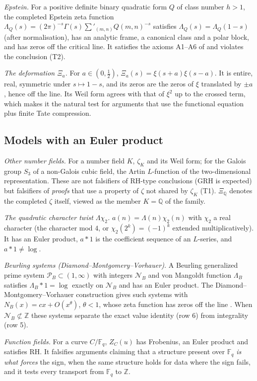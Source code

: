 \documentclass[11pt]{amsart}
\theoremstyle{definition}
\theoremstyle{remark}
\newcommand{\Z}{\mathbb Z}
\newcommand{\Q}{\mathbb Q}
\begin{document}
\emph{Epstein.} For a positive definite binary quadratic form $Q$ of class number $h>1$, the completed
Epstein zeta function $\Lambda_Q(s)=(2\pi)^{-s}\Gamma(s)\sum'_{(m,n)}Q(m,n)^{-s}$ satisfies
$\Lambda_Q(s)=\Lambda_Q(1-s)$ (after normalisation), has an analytic frame, a canonical class and a
polar block, and has zeros off the critical line. It satisfies the axioms A1--A6 of \cite[\S18]{Paper46}
and violates the conclusion (T2).

\emph{The deformation $\Xi_a$.} For $a\in(0,\frac12)$, $\Xi_a(s)=\xi(s+a)\xi(s-a)$. It is entire, real,
symmetric under $s\mapsto1-s$, and its zeros are the zeros of $\xi$ translated by $\pm a$, hence off
the line. Its Weil form agrees with that of $\xi^2$ up to the crossed term, which makes it the natural
test for arguments that use the functional equation plus finite Tate compression.

\subsection{Models with an Euler product}
\emph{Other number fields.} For a number field $K$, $\zeta_K$ and its Weil form; for the Galois group
$S_3$ of a non-Galois cubic field, the Artin $L$-function of the two-dimensional representation. These
are not falsifiers of RH-type conclusions (GRH is expected) but falsifiers of \emph{proofs} that use a
property of $\zeta$ not shared by $\zeta_K$ (T1). $\Xi_\Q$ denotes the completed $\zeta$ itself, viewed as
the member $K=\Q$ of the family.

\emph{The quadratic character twist $\Lambda\chi_2$.} $a(n)=\Lambda(n)\chi_2(n)$ with $\chi_2$ a real
character (the character mod $4$, or $\chi_2(2^k)=(-1)^k$ extended multiplicatively). It has an Euler
product, $a*1$ is the coefficient sequence of an $L$-series, and $a*1\ne\log$.

\emph{Beurling systems (Diamond--Montgomery--Vorhauer).} A Beurling generalized prime system $\mathcal
P_B\subset(1,\infty)$ with integers $\mathcal N_B$ and von Mangoldt function $\Lambda_B$ satisfies
$\Lambda_B*1=\log$ exactly on $\mathcal N_B$ and has an Euler product. The Diamond--Montgomery--Vorhauer
construction gives such systems with $N_B(x)=cx+O(x^\theta)$, $\theta<1$, whose zeta function has zeros
off the line \cite{DMV2006}. When $\mathcal N_B\not\subset\Z$ these systems separate the exact value
identity (row 6) from integrality (row 5).

\emph{Function fields.} For a curve $C/\mathbb F_q$, $Z_C(u)$ has Frobenius, an Euler product and satisfies
RH. It falsifies arguments claiming that a structure present over $\mathbb F_q$ \emph{is what forces} the
sign, when the same structure holds for data where the sign fails, and it tests every transport from
$\mathbb F_q$ to $\Z$.
\end{document}
